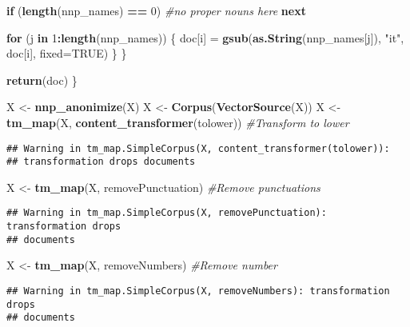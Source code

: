 \documentclass[]{article}
\newenvironment{Shaded}{\begin{snugshade}}{\end{snugshade}}
\newcommand{\CommentTok}[1]{\textcolor[rgb]{0.56,0.35,0.01}{\textit{#1}}}
\newcommand{\ControlFlowTok}[1]{\textcolor[rgb]{0.13,0.29,0.53}{\textbf{#1}}}
\newcommand{\DataTypeTok}[1]{\textcolor[rgb]{0.13,0.29,0.53}{#1}}
\newcommand{\DecValTok}[1]{\textcolor[rgb]{0.00,0.00,0.81}{#1}}
\newcommand{\KeywordTok}[1]{\textcolor[rgb]{0.13,0.29,0.53}{\textbf{#1}}}
\newcommand{\NormalTok}[1]{#1}
\newcommand{\OperatorTok}[1]{\textcolor[rgb]{0.81,0.36,0.00}{\textbf{#1}}}
\newcommand{\OtherTok}[1]{\textcolor[rgb]{0.56,0.35,0.01}{#1}}
\newcommand{\StringTok}[1]{\textcolor[rgb]{0.31,0.60,0.02}{#1}}
\begin{document}
\begin{Shaded}
\begin{Highlighting}[]
  \ControlFlowTok{if}\NormalTok{ (}\KeywordTok{length}\NormalTok{(nnp_names) }\OperatorTok{==}\StringTok{ }\DecValTok{0}\NormalTok{) }\CommentTok{#no proper nouns here}
    \ControlFlowTok{next}
  
  \ControlFlowTok{for}\NormalTok{ (j }\ControlFlowTok{in} \DecValTok{1}\OperatorTok{:}\KeywordTok{length}\NormalTok{(nnp_names))}
\NormalTok{  \{}
\NormalTok{    doc[i] =}\StringTok{ }\KeywordTok{gsub}\NormalTok{(}\KeywordTok{as.String}\NormalTok{(nnp_names[j]), }\StringTok{"it"}\NormalTok{, doc[i], }\DataTypeTok{fixed=}\OtherTok{TRUE}\NormalTok{)}
\NormalTok{  \}}
\NormalTok{\}}
  
  \KeywordTok{return}\NormalTok{(doc)}
\NormalTok{\}}

\NormalTok{X <-}\StringTok{ }\KeywordTok{nnp_anonimize}\NormalTok{(X)}
\NormalTok{X <-}\StringTok{ }\KeywordTok{Corpus}\NormalTok{(}\KeywordTok{VectorSource}\NormalTok{(X))}
\NormalTok{X <-}\StringTok{ }\KeywordTok{tm_map}\NormalTok{(X, }\KeywordTok{content_transformer}\NormalTok{(tolower)) }\CommentTok{#Transform to lower}
\end{Highlighting}
\end{Shaded}

\begin{verbatim}
## Warning in tm_map.SimpleCorpus(X, content_transformer(tolower)):
## transformation drops documents
\end{verbatim}

\begin{Shaded}
\begin{Highlighting}[]
\NormalTok{X <-}\StringTok{ }\KeywordTok{tm_map}\NormalTok{(X, removePunctuation) }\CommentTok{#Remove punctuations}
\end{Highlighting}
\end{Shaded}

\begin{verbatim}
## Warning in tm_map.SimpleCorpus(X, removePunctuation): transformation drops
## documents
\end{verbatim}

\begin{Shaded}
\begin{Highlighting}[]
\NormalTok{X <-}\StringTok{ }\KeywordTok{tm_map}\NormalTok{(X, removeNumbers) }\CommentTok{#Remove number}
\end{Highlighting}
\end{Shaded}

\begin{verbatim}
## Warning in tm_map.SimpleCorpus(X, removeNumbers): transformation drops
## documents
\end{verbatim}
\end{document}
